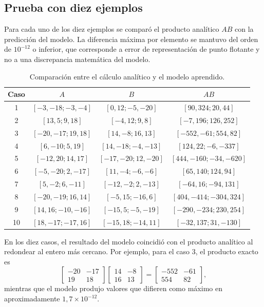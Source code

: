 \documentclass[14pt,twoside]{article}
\begin{document}
\subsection{Prueba con diez ejemplos}

Para cada uno de los diez ejemplos se comparó el producto analítico $A B$ con la predicción del modelo. La diferencia máxima por elemento se mantuvo del orden de $10^{-12}$ o inferior, que corresponde a error de representación de punto flotante y no a una discrepancia matemática del modelo.

\begin{table}[H]
\centering
\small
\caption{Comparación entre el cálculo analítico y el modelo aprendido.}
\begin{tabular}{c|c|c|c}
\toprule
Caso & $A$ & $B$ & $AB$ \\
\midrule
1 & $[-3,-18;-3,-4]$ & $[0,12;-5,-20]$ & $[90,324;20,44]$ \\
2 & $[13,5;9,18]$ & $[-4,12;9,8]$ & $[-7,196;126,252]$ \\
3 & $[-20,-17;19,18]$ & $[14,-8;16,13]$ & $[-552,-61;554,82]$ \\
4 & $[6,-10;5,19]$ & $[14,-18;-4,-13]$ & $[124,22;-6,-337]$ \\
5 & $[-12,20;14,17]$ & $[-17,-20;12,-20]$ & $[444,-160;-34,-620]$ \\
6 & $[-5,-20;2,-17]$ & $[11,-4;-6,-6]$ & $[65,140;124,94]$ \\
7 & $[5,-2;6,-11]$ & $[-12,-2;2,-13]$ & $[-64,16;-94,131]$ \\
8 & $[-20,-19;16,14]$ & $[-5,15;-16,6]$ & $[404,-414;-304,324]$ \\
9 & $[14,16;-10,-16]$ & $[-15,5;-5,-19]$ & $[-290,-234;230,254]$ \\
10 & $[18,-17;-17,16]$ & $[-15,18;-14,11]$ & $[-32,137;31,-130]$ \\
\bottomrule
\end{tabular}
\end{table}

En los diez casos, el resultado del modelo coincidió con el producto analítico al redondear al entero más cercano. Por ejemplo, para el caso 3, el producto exacto es
\[
\begin{bmatrix}-20&-17\\19&18\end{bmatrix}
\begin{bmatrix}14&-8\\16&13\end{bmatrix}
=
\begin{bmatrix}-552&-61\\554&82\end{bmatrix},
\]
mientras que el modelo produjo valores que difieren como máximo en aproximadamente $1,7\times10^{-12}$.
\end{document}
